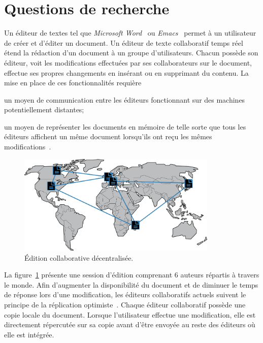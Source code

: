 
\section{Questions de recherche}

Un éditeur de textes tel que \emph{Microsoft Word}~\cite{word} ou
\emph{Emacs}~\cite{emacs} permet à un utilisateur de créer et d'éditer un
document. Un éditeur de texte collaboratif temps réel~\cite{ellis1991groupware}
étend la rédaction d'un document à un groupe d'utilisateurs. Chacun possède son
éditeur, voit les modifications effectuées par ses collaborateurs sur le
document, effectue ses propres changements en insérant ou en supprimant du
contenu. La mise en place de ces fonctionnalités requière
\begin{inparaenum}[(i)]
\item un moyen de communication entre les éditeurs fonctionnant sur des machines
  potentiellement distantes;
\item un moyen de représenter les documents en mémoire de telle sorte que tous
  les éditeurs affichent un même document lorsqu'ils ont reçu les mêmes
  modifications~\cite{burckhardt2014replicated, shapiro2011conflict}.
\end{inparaenum}

\begin{figure}
  \begin{center}
    \includegraphics[width=0.85\textwidth]{img/world.png}
    \caption[Édition collaborative décentralisée]{\label{intro:img:world}Édition
      collaborative décentralisée.}
  \end{center}
\end{figure}

La figure~\ref{intro:img:world} présente une session d'édition comprenant 6
auteurs répartis à travers le monde. Afin d'augmenter la disponibilité du
document et de diminuer le temps de réponse lors d'une modification, les
éditeurs collaboratifs actuels suivent le principe de la réplication
optimiste~\cite{saito2005optimistic}. Chaque éditeur collaboratif possède une
copie locale du document.  Lorsque l'utilisateur effectue une modification, elle
est directement répercutée sur sa copie avant d'être envoyée au reste des
éditeurs où elle est intégrée.


